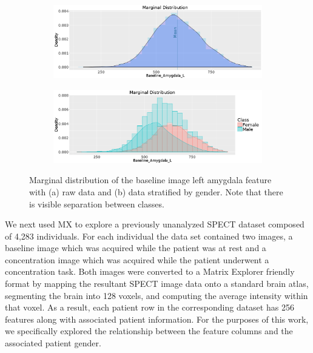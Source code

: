 \documentclass[twoside,leqno,twocolumn]{article}
\begin{document}
\begin{figure}[t]
	\centering
	\begin{subfigure}[t]{0.48\textwidth}
		\includegraphics[width=\textwidth,valign=t]{Figures/Spect_Gender/NonClass_Baseline_Amygdala_L.png}
		\subcaption{}
		\label{fig:FigSpecNoClassMarginal}
	\end{subfigure}
	\begin{subfigure}[t]{0.48\textwidth}
		\includegraphics[width=\textwidth,valign=t]{Figures/Spect_Gender/Baseline_Amygdala_L_Marginal.png}
		\subcaption{}
		\label{fig:FigSpecMarginal}
	\end{subfigure}
	\caption{Marginal distribution of the baseline image left amygdala feature with (a) raw data and (b) data stratified by gender. Note that there is visible separation between classes.}
	\label{fig:FigSpectMarginalCaption}
\end{figure}

We next used MX to explore a previously unanalyzed SPECT dataset composed of 4,283 individuals. For each individual the data set contained two images, a baseline image which was acquired while the patient was at rest and a concentration image which was acquired while the patient underwent a concentration task. Both images were converted to a Matrix Explorer friendly format by mapping the resultant SPECT image data onto a standard brain atlas, segmenting the brain into 128 voxels, and computing the average intensity within that voxel. As a result, each patient row in the corresponding dataset has 256 features along with associated patient information. For the purposes of this work, we specifically explored the relationship between the feature columns and the associated patient gender. 
\end{document}
